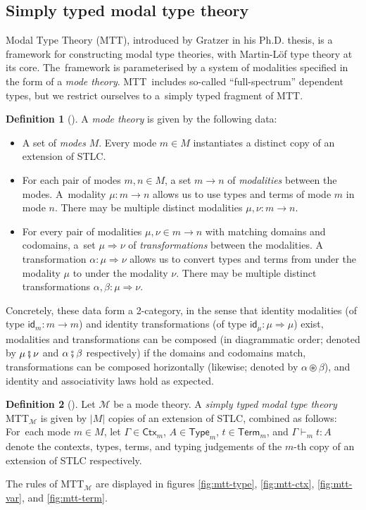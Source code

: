 \documentclass{scrartcl}
\theoremstyle{definition}
\newtheorem{definition}{Definition}
\theoremstyle{plain}
\newcommand{\modetheory}[1]{\mathcal{#1}}
\newcommand{\M}{\modetheory{M}}
\newcommand{\MTTM}{MTT${}_{\M}$}
\begin{document}

\subsection{Simply typed modal type theory}
Modal Type Theory (MTT), introduced by Gratzer in his Ph.D.
thesis\cite{gratzer2023syntax}, is a framework for constructing modal type
theories, with Martin-Löf type theory at its core. The~framework is
parameterised by a system of modalities specified in the form of a \emph{mode
theory}. MTT~includes so-called ``full-spectrum'' dependent types, but we
restrict ourselves to a~simply typed fragment of MTT.
\begin{definition}[{\cite[§6.1.1]{gratzer2023syntax}}]
  A \emph{mode theory} is given by the following data:
  \begin{itemize}
  \item
    A set of \emph{modes} $M$. Every mode $m \in M$ instantiates a distinct
    copy of an extension of STLC.
  \item
    For each pair of modes $m, n \in M$, a set $m \to n$ of \emph{modalities}
    between the modes. A~modality $\mu : m \to n$ allows us to use types and
    terms of mode $m$ in mode $n$. There may be multiple distinct modalities
    $\mu , \nu : m \to n$.
  \item
    For every pair of modalities $\mu, \nu \in m \to n$ with matching domains
    and codomains, a~set $\mu \Rightarrow \nu$ of \emph{transformations}
    between the modalities. A transformation $\alpha : \mu \Rightarrow \nu$
    allows us to convert types and terms from under the modality $\mu$ to under
    the modality $\nu$. There may be multiple distinct transformations $\alpha,
    \beta : \mu \Rightarrow \nu$.
  \end{itemize}
  Concretely, these data form a 2-category, in the sense that identity
  modalities (of type $\textsf{id}_m : m \to m$) and identity transformations
  (of type $\textsf{id}_\mu : \mu \Rightarrow \mu $) exist, modalities and
  transformations can be composed (in diagrammatic order; denoted by $\mu
  \fatsemi \nu$ and $\alpha \fatsemi \beta$ respectively) if the domains and
  codomains match, transformations can be composed horizontally (likewise;
  denoted by $\alpha \circledast \beta$), and identity and associativity laws
  hold as expected\cite{licata2016adjoint}.
\end{definition}
\begin{definition}[{\cite[following §6.2]{gratzer2023syntax}}]
  Let $\M$ be a mode theory. A \emph{simply typed modal type theory} \MTTM{} is
  given by $|M|$ copies of an extension of STLC, combined as follows: For~each
  mode $m \in M$, let $\Gamma\in\textsf{Ctx}_m$, $A \in \textsf{Type}_m$, $t
  \in \textsf{Term}_m$, and $\Gamma \vdash_m t : A$ denote the contexts, types,
  terms, and typing judgements of the $m$-th copy of an extension of STLC
  respectively.

  The rules of \MTTM{} are displayed in figures \ref{fig:mtt-type},
  \ref{fig:mtt-ctx}, \ref{fig:mtt-var}, and \ref{fig:mtt-term}.
\end{definition}
\end{document}
